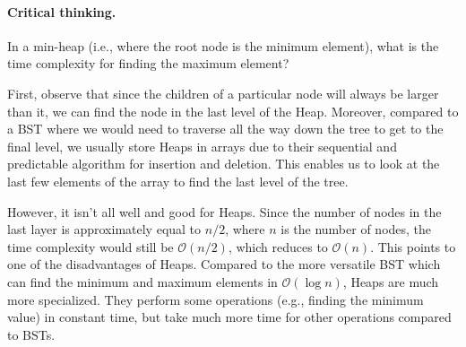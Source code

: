 \documentclass{pset_template}
\begin{document}
\paragraph{Critical thinking.}
In a min-heap (i.e., where the root node is the minimum element),
what is the time complexity for finding the maximum element?

First, observe that since the children of a particular node will always
be larger than it, we can find the node in the last level of the Heap.
Moreover, compared to a BST where we would need to traverse all the way down the
tree to get to the final level,
we usually store Heaps in arrays due to their sequential and predictable algorithm
for insertion and deletion.
This enables us to look at the last few elements of the array to find the last level
of the tree.

However, it isn't all well and good for Heaps.
Since the number of nodes in the last layer is approximately equal to $n/2$, where
$n$ is the number of nodes, the time complexity would still be $\mathcal{O}(n/2)$,
which reduces to $\mathcal{O}(n)$.
This points to one of the disadvantages of Heaps.
Compared to the more versatile BST which can find the minimum and maximum
elements in $\mathcal{O}(\log{}n)$,
Heaps are much more specialized.
They perform some operations (e.g., finding the minimum value)
in constant time, but take much more time for other operations compared to BSTs.
\end{document}
